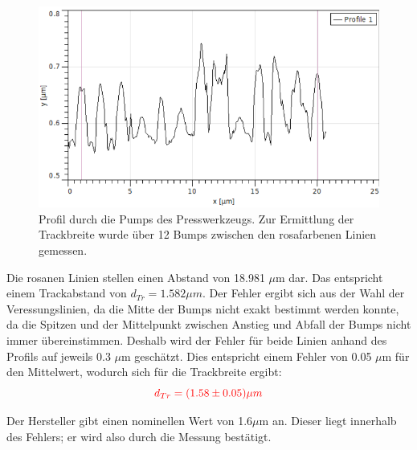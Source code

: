 \begin{figure}[h]
    \centering
    \includegraphics[scale = 0.65]{Bilder/CD20Profil.png}
    \caption{Profil durch die Pumps des Presswerkzeugs. Zur Ermittlung der Trackbreite wurde über 12 Bumps zwischen den rosafarbenen 
    Linien gemessen.}
    \label{bild:CD20Profil}
\end{figure}


Die rosanen Linien stellen einen Abstand von 18.981 $\mu$m dar. Das entspricht einem Trackabstand von $d_{Tr} = 1.582 \mu m$.
Der Fehler ergibt sich aus der Wahl der Veressungslinien, da die Mitte der Bumps nicht exakt bestimmt werden konnte, da die Spitzen und 
der Mittelpunkt zwischen Anstieg und Abfall der Bumps nicht immer übereinstimmen. Deshalb wird der Fehler für beide Linien anhand des 
Profils auf jeweils 0.3 $\mu$m geschätzt. Dies entspricht einem Fehler von 0.05 $\mu$m für den Mittelwert, wodurch sich für die Trackbreite 
ergibt: 
\begin{equation*}
    \textcolor{red}{d_{Tr} = (1.58 \pm 0.05) \mu m}
\end{equation*}

Der Hersteller gibt einen nominellen Wert von 1.6$\mu$m an. Dieser liegt innerhalb des Fehlers; er wird also durch die Messung bestätigt.